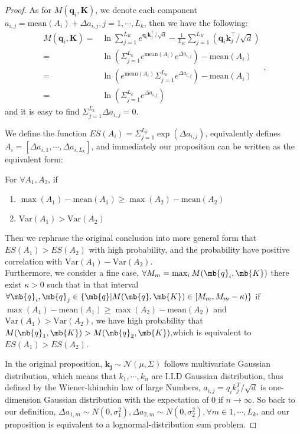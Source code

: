 \begin{appendices}
\begin{proof}
As for $M\left(\mathbf{q}_{i}, \mathbf{K}\right)$, we denote each component $a_{i,j}= \mathrm{mean}(A_i) + \Delta a_{i,j},j=1,\cdots,L_k$, then we have the following:
\begin{equation}
\nonumber
\begin{aligned}
M\left(\mathbf{q}_{i}, \mathbf{K}\right)=&\ln \sum_{j=1}^{L_{K}} e^{{\mathbf{q}_{i} \mathbf{k}_{j}^{\top}}/{\sqrt{d}}}-\frac{1}{L_{K}}
\sum_{j=1}^{L_{K}} ({\mathbf{q}_{i} \mathbf{k}_{j}^{\top}}/{\sqrt{d}})\\
=&\ln(\Sigma_{j=1}^{L_k} e^{\mathrm{mean}(A_i)}e^{\Delta a_{i,j}})-\mathrm{mean}(A_i)\\
=&\ln(e^{\mathrm{mean}(A_i)} \Sigma_{j=1}^{L_k} e^{\Delta a_{i,j}})-\mathrm{mean}(A_i)\\
=&\ln(\Sigma_{j=1}^{L_k}e^{\Delta a_{i,j}})
\end{aligned},
\end{equation}
and it is easy to find $\Sigma_{j=1}^{L_k}\Delta a_{i,j} = 0$.

We define the function $ES(A_i)=\Sigma_{j=1}^{L_k}\exp(\Delta a_{i,j})$, equivalently defines $A_i = [\Delta a_{i,1},\cdots,\Delta a_{i,L_k}]$, and immediately our proposition can be written as the equivalent form:

For $\forall A_1,A_2$, if
\begin{enumerate}[nosep,  leftmargin=0.85cm]
\item $\max(A_1)-\mathrm{mean}(A_1)\geq \max(A_2)-\mathrm{mean}(A_2)$
\item $\mathrm{Var}(A_1) > \mathrm{Var}(A_2)$
\end{enumerate}
Then we rephrase the original conclusion into more general form that $ES(A_1)>ES(A_2)$ with high probability, and the probability have positive correlation with $\mathrm{Var}(A_1)-\mathrm{Var}(A_2)$.\\

Furthermore, we consider a fine case, $\forall M_{m} = \max_{i} M(\mb{q}_i, \mb{K})$ there exist $\kappa > 0$ such that in that interval $\forall \mb{q}_i, \mb{q}_j \in \{ \mb{q} | M(\mb{q}, \mb{K}) \in [ M_{m},  M_{m} - \kappa)\}$ if $\max(A_1)-\mathrm{mean}(A_1)\geq \max(A_2)-\mathrm{mean}(A_2)$ and~$\mathrm{Var}(A_1) > \mathrm{Var}(A_2)$, we have high probability that $M(\mb{q}_1, \mb{K}) > M(\mb{q}_2, \mb{K})$,which is equivalent to $ES(A_1) > ES(A_2)$.

In the original proposition, $\mathbf{k}_{\mathbf{j}} \sim \mathcal{N}(\mu, \Sigma)$ follows multivariate Gaussian distribution, which means that $k_1,\cdots,k_n$ are I.I.D Gaussian distribution, thus defined by the Wiener-khinchin law of large Numbers, $a_{i,j}={q_i k_j^T}/{\sqrt{d}}$ is one-dimension Gaussian distribution with the expectation of 0 if $n\rightarrow \infty$. So back to our definition, $\Delta a_{1,m} \sim N(0,\sigma_1^2),\Delta a_{2,m} \sim N(0,\sigma_2^2),\forall m\in 1,\cdots,L_k$, and our proposition is equivalent to a lognormal-distribution sum problem.
 

\end{proof}
\end{appendices}
